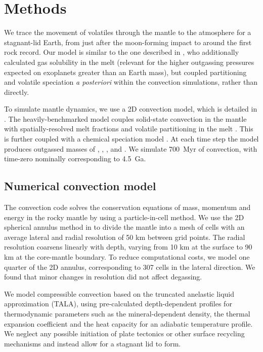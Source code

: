 \section{Methods}

We trace the movement of volatiles through the mantle to the atmosphere for a stagnant-lid Earth, from just after the moon-forming impact to around the first rock record. Our model is similar to the one described in \citet{ortenzi_mantle_2020}, who additionally calculated gas solubility in the melt (relevant for the higher outgassing pressures expected on exoplanets greater than an Earth mass), but coupled partitioning and volatile speciation \textit{a posteriori} within the convection simulations, rather than directly.


To simulate mantle dynamics, we use a 2D convection model, which is detailed in \citet{noack2016modeling}. The heavily-benchmarked model couples solid-state convection in the mantle with spatially-resolved melt fractions and volatile partitioning in the melt \citep{holloway_highpressure_1992, katz_new_2003, Grott2011}. This is further coupled with a chemical speciation model \citep{French1966, Holloway1981, Fegley2013, gaillard_theoretical_2014, schaefer_redox_2017}. At each time step the model produces outgassed masses of , , , and . We simulate 700~Myr of convection, with time-zero nominally corresponding to 4.5~Ga.



\subsection{Numerical convection model}

The convection code solves the conservation equations of mass, momentum and energy in the rocky mantle by using a particle-in-cell method. We use the 2D spherical annulus method in \citet{HERNLUND2008} to divide the mantle into a mesh of cells with an average lateral and radial resolution of 50 km between grid points. The radial resolution coarsens linearly with depth, varying from 10 km at the surface to 90 km at the core-mantle boundary. To reduce computational costs, we model one quarter of the 2D annulus, corresponding to 307 cells in the lateral direction. We found that minor changes in resolution did not affect degassing.

We model compressible convection based on the truncated anelastic liquid approximation (TALA), using pre-calculated depth-dependent profiles for thermodynamic parameters such as the mineral-dependent density, the thermal expansion coefficient and the heat capacity for an adiabatic temperature profile. We neglect any possible initiation of plate tectonics or other surface recycling mechanisms and instead allow for a stagnant lid to form. 

